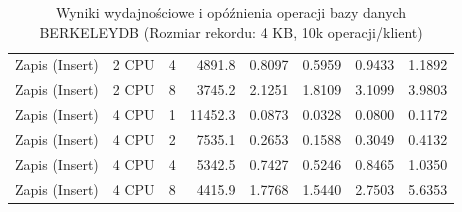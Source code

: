 \begin{table}[ht]
{\begin{tabular}{llcrrrrr}
Zapis (Insert) & 2 CPU & 4 & 4891.8 & 0.8097 & 0.5959 & 0.9433 & 1.1892 \\
Zapis (Insert) & 2 CPU & 8 & 3745.2 & 2.1251 & 1.8109 & 3.1099 & 3.9803 \\
Zapis (Insert) & 4 CPU & 1 & 11452.3 & 0.0873 & 0.0328 & 0.0800 & 0.1172 \\
Zapis (Insert) & 4 CPU & 2 & 7535.1 & 0.2653 & 0.1588 & 0.3049 & 0.4132 \\
Zapis (Insert) & 4 CPU & 4 & 5342.5 & 0.7427 & 0.5246 & 0.8465 & 1.0350 \\
Zapis (Insert) & 4 CPU & 8 & 4415.9 & 1.7768 & 1.5440 & 2.7503 & 5.6353 \\
\bottomrule
\end{tabular}%
}
\caption{Wyniki wydajnościowe i opóźnienia operacji bazy danych BERKELEYDB (Rozmiar rekordu: 4 KB, 10k operacji/klient)}
\label{tab:latency_berkeleydb_medium_10000}
\end{table}
